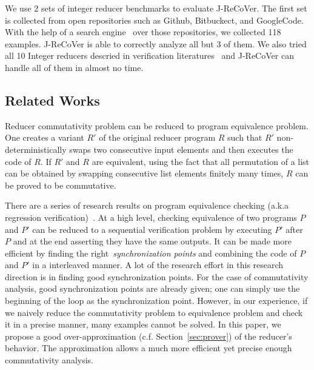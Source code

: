 \documentclass{llncs}
\begin{document}
We use 2 sets of integer reducer benchmarks to evaluate J-ReCoVer. The first set is collected from open repositories such as Github, Bitbuckect, and GoogleCode. With the help of a search engine~\cite{searchcode} over those repositories, we collected 118 examples. J-ReCoVer is able to correctly analyze all but 3 of them. We also tried all 10 Integer reducers descried in verification literatures~\cite{ChenHSW15,ChenSW16} and J-ReCoVer can handle all of them in almost no time.


\subsection*{Related Works}
Reducer commutativity problem can be reduced to program equivalence problem. One creates a variant $R'$ of the original reducer program $R$ such that $R'$ non-deterministically swaps two consecutive input elements and then executes the code of $R$. If $R'$ and $R$ are equivalent, using the fact that all permutation of a list can be obtained by swapping consecutive list elements finitely many times, $R$ can be proved to be commutative. 

There are a series of research results on program equivalence checking (a.k.a regression verification)~\cite{symdiff,fedyukovich2015automated,sharma2013data,godlin2009regression,fedyukovich2016property,felsing2014automating,KieferKlebanovUlbrich2017,lahiri2013differential,grossman2017verifying,barthe2011relational,KlebanovRuemmerUlbrich2017}. At a high level, checking equivalence of two programs $P$ and $P'$ can be reduced to a sequential verification problem by executing $P'$ after $P$ and at the end asserting they have the same outputs. It can be made more efficient by finding the right~\emph{synchronization points} and combining the code of $P$ and $P'$ in a interleaved manner. A lot of the research effort in this research direction is in finding good synchronization points. For the case of commutativity analysis, good synchronization points are already given; one can simply use the beginning of the loop as the synchronization point. However, in our experience, if we naively reduce the commutativity problem to equivalence problem and check it in a precise manner, many examples cannot be solved. In this paper, we propose a good over-approximation (c.f. Section~\ref{sec:prover}) of the reducer's behavior. The approximation allows a much more efficient yet precise enough commutativity analysis.
\end{document}
